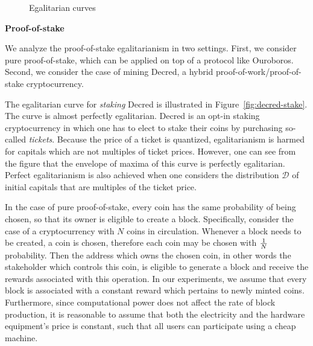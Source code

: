 

\begin{figure}
  \caption{Egalitarian curves}
  \label{fig:egalitarian_curves}
\end{figure}

\noindent\textbf{Proof-of-stake}

\noindent
We analyze the proof-of-stake egalitarianism in two settings. First, we
consider pure proof-of-stake, which can be applied on top of a protocol like
Ouroboros. Second, we consider the case of mining Decred, a hybrid
proof-of-work/proof-of-stake cryptocurrency.

The egalitarian curve for \emph{staking} Decred is illustrated in
Figure~\ref{fig:decred-stake}. The curve is almost perfectly egalitarian. Decred
is an opt-in staking cryptocurrency in which one has to elect to stake their
coins by purchasing so-called \emph{tickets}. Because the price of a ticket is
quantized, egalitarianism is harmed for capitals which are not multiples of
ticket prices. However, one can see from the figure that the envelope of maxima
of this curve is perfectly egalitarian. Perfect egalitarianism is also achieved
when one considers the distribution $\mathcal{D}$ of initial capitals that are
multiples of the ticket price.


In the case of pure proof-of-stake, every coin has the same probability of being chosen, so that its owner is eligible to create a block. Specifically, consider the case of a cryptocurrency with $N$ coins in circulation. Whenever a block needs to be created, a coin is chosen, therefore each coin may be chosen with $1 \over N$ probability. Then the address which owns the chosen coin, in other words the stakeholder which controls this coin, is eligible to generate a block and receive the rewards associated with this operation. In our experiments, we assume that every block is associated with a constant reward which pertains to newly minted coins. Furthermore, since computational power does not affect the rate of block production, it is reasonable to assume that both the electricity and the hardware equipment's price is constant, such that all users can participate using a cheap machine.

